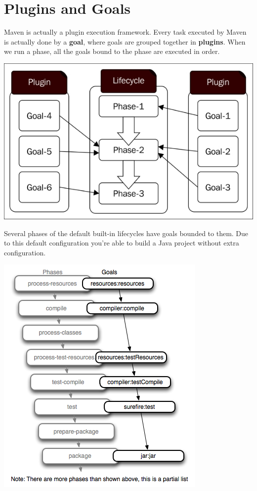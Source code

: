 \section{Plugins and Goals}

Maven is actually a plugin execution framework. Every task executed by Maven is actually done by a \textbf{goal}, where goals are grouped together in \textbf{plugins}.  When we run a phase, all the goals bound to the phase are executed in order.

\includegraphics[width=\textwidth]{./images/maven/maven_goals} 

Several phases of the default built-in lifecycles have goals bounded to them.  Due to this default configuration you're able to build a Java project without extra configuration.

\includegraphics[width=\textwidth]{./images/maven/maven-lifecycle-binding} 

